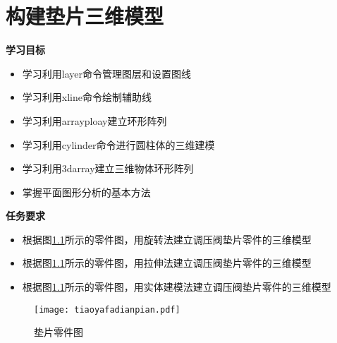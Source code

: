 \chapter{构建垫片三维模型}\label{chap:dianpian}

{\bfseries 学习目标}
\begin{itemize}
\item 学习利用layer命令管理图层和设置图线
\item 学习利用xline命令绘制辅助线
\item 学习利用arrayploay建立环形阵列
\item 学习利用cylinder命令进行圆柱体的三维建模
\item 学习利用3darray建立三维物体环形阵列
\item 掌握平面图形分析的基本方法
\end{itemize}

{\bfseries 任务要求}
\begin{itemize}
\item 根据图\ref{fig:tiaoyafadianpian}所示的零件图，用旋转法建立调压阀垫片零件的三维模型
\item 根据图\ref{fig:tiaoyafadianpian}所示的零件图，用拉伸法建立调压阀垫片零件的三维模型
\item 根据图\ref{fig:tiaoyafadianpian}所示的零件图，用实体建模法建立调压阀垫片零件的三维模型
\end{itemize}

\noindent
\begin{figure}[htbp]
\centering
\texttt{[image: tiaoyafadianpian.pdf]}
\caption{垫片零件图}\label{fig:tiaoyafadianpian}
\end{figure}
\clearpage








\endinput